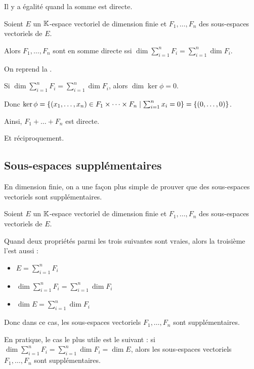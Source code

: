 Il y a égalité quand la somme est directe.

\begin{theo}
Soient \(E\) un \(\mathbb{K}\)-espace vectoriel de dimension finie et \(F_1,\dots,F_n\) des sous-espaces vectoriels de \(E\).

Alors \(F_1,\dots,F_n\) sont en somme directe ssi \(\dim\sum_{i=1}^nF_i=\sum_{i=1}^n\dim F_i\).
\end{theo}

\begin{dem}
On reprend la .

Si \(\dim\sum_{i=1}^nF_i=\sum_{i=1}^n\dim F_i\), alors \(\dim\ker\phi=0\).

Donc \(\ker\phi=\left\lbrace\left(x_1,\dots,x_n\right)\in F_1\times\dots\times F_n\;\middle|\;\sum_{i=1}^nx_i=0\right\rbrace=\left\lbrace\left(0,\dots,0\right)\right\rbrace\).

Ainsi, \(F_1+\dots+F_n\) est directe.

Et réciproquement.
\end{dem}

\subsection{Sous-espaces supplémentaires}

En dimension finie, on a une façon plus simple de prouver que des sous-espaces vectoriels sont supplémentaires.

\begin{prop}
Soient \(E\) un \(\mathbb{K}\)-espace vectoriel de dimension finie et \(F_1,\dots,F_n\) des sous-espaces vectoriels de \(E\).

Quand deux propriétés parmi les trois suivantes sont vraies, alors la troisième l'est aussi :

\begin{itemize}
    \item \(E=\sum_{i=1}^nF_i\) \\
    \item \(\dim\sum_{i=1}^nF_i=\sum_{i=1}^n\dim F_i\) \\
    \item \(\dim E=\sum_{i=1}^n\dim F_i\)
\end{itemize}

Donc dans ce cas, les sous-espaces vectoriels \(F_1,\dots,F_n\) sont supplémentaires.
\end{prop}

En pratique, le cas le plus utile est le suivant : si \(\dim\sum_{i=1}^nF_i=\sum_{i=1}^n\dim F_i=\dim E\), alors les sous-espaces vectoriels \(F_1,\dots,F_n\) sont supplémentaires.

